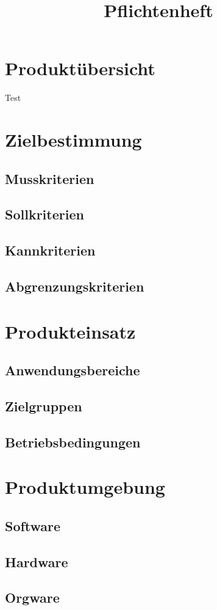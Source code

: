 \documentclass[a4paper,10pt]{article}
\title{Pflichtenheft}
\author{}
\begin{document}
\tableofcontents

\section{Produktübersicht}
Test
\section{Zielbestimmung}
\subsection{Musskriterien}
\subsection{Sollkriterien}
\subsection{Kannkriterien}
\subsection{Abgrenzungskriterien}
\section{Produkteinsatz}
\subsection{Anwendungsbereiche}
\subsection{Zielgruppen}
\subsection{Betriebsbedingungen}
\section{Produktumgebung}
\subsection{Software}
\subsection{Hardware}
\subsection{Orgware}
\end{document}
